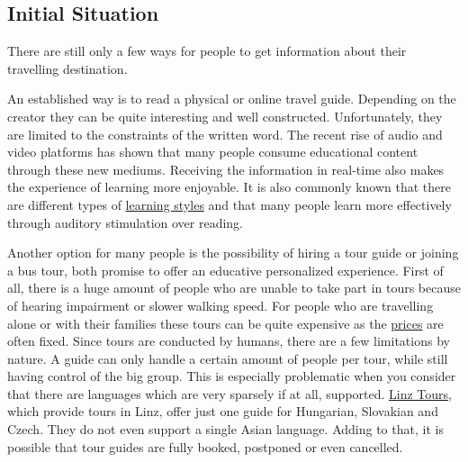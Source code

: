 \documentclass[12pt]{article}
\theoremstyle{definition}
\newenvironment{text}{
   \setlength{\parindent}{0pt}
   \color{black}
}{}
\begin{document}
\subsection{Initial Situation}

\begin{text}
There are still only a few ways for people to get information about their travelling destination.\newline

An established way is to read a physical or online travel guide. Depending on the creator they can be quite interesting and well constructed. Unfortunately, they are limited to the constraints of the written word. The recent rise of audio and video platforms has shown that many people consume educational content through these new mediums. Receiving the information in real-time also makes the experience of learning more enjoyable. It is also commonly known that there are different types of \href{https://www.tandfonline.com/doi/full/10.1080/0144341042000228834}{learning styles} and that many people learn more effectively through auditory stimulation over reading.\newline
 
Another option for many people is the possibility of hiring a tour guide or joining a bus tour, both promise to offer an educative personalized experience. 
First of all, there is a huge amount of people who are unable to take part in tours because of hearing impairment or slower walking speed.
For people who are travelling alone or with their families these tours can be quite expensive as the \href{https://www.guides-in-vienna.at/costs-terms//}{prices} are often fixed.
Since tours are conducted by humans, there are a few limitations by nature. A guide can only handle a certain amount of people per tour, while still having control of the big group. This is especially problematic when you consider that there are languages which are very sparsely if at all, supported. \href{https://linz-tours.at}{Linz Tours}, which provide tours in Linz, offer just one guide for Hungarian, Slovakian and Czech. They do not even support a single Asian language. Adding to that, it is possible that tour guides are fully booked, postponed or even cancelled.\newline
 

\end{text}
\end{document}
